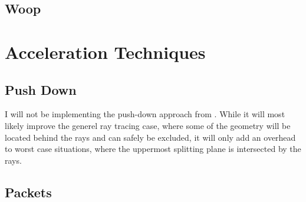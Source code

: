 
\subsection{Woop}




\section{Acceleration Techniques}



\subsection{Push Down}

I will not be implementing the push-down approach from
. While it will most likely improve the generel ray
tracing case, where some of the geometry will be located behind the
rays and can safely be excluded, it will only add an overhead to worst
case situations, where the uppermost splitting plane is intersected by
the rays.

\subsection{Packets}




